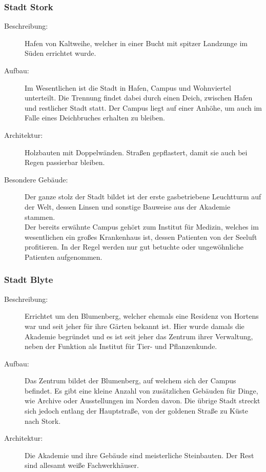 \documentclass[a4paper,12pt,oneside]{book}
\begin{document}
\subsubsection{Stadt Stork}
\begin{description}
\item[Beschreibung:]Hafen von Kaltweihe, welcher in einer Bucht mit spitzer Landzunge im Süden errichtet wurde.
\item[Aufbau:]Im Wesentlichen ist die Stadt in Hafen, Campus und Wohnviertel unterteilt. Die Trennung findet dabei durch einen Deich, zwischen Hafen und restlicher Stadt statt. Der Campus liegt auf einer Anhöhe, um auch im Falle eines Deichbruches erhalten zu bleiben.
\item[Architektur:]Holzbauten mit Doppelwänden. Straßen gepflastert, damit sie auch bei Regen passierbar bleiben.
\item[Besondere Gebäude:]Der ganze stolz der Stadt bildet ist der erste gasbetriebene Leuchtturm auf der Welt, dessen Linsen und sonstige Bauweise aus der Akademie stammen.
\\Der bereits erwähnte Campus gehört zum Institut für Medizin, welches im wesentlichen ein großes Krankenhaus ist, dessen Patienten von der Seeluft profitieren. In der Regel werden nur gut betuchte oder ungewöhnliche Patienten aufgenommen.
\end{description}

\subsubsection{Stadt Blyte}
\begin{description}
\item[Beschreibung:]Errichtet um den Blumenberg, welcher ehemals eine Residenz von Hortens war und seit jeher für ihre Gärten bekannt ist. Hier wurde damals die Akademie begründet und es ist seit jeher das Zentrum ihrer Verwaltung, neben der Funktion als Institut für Tier- und Pflanzenkunde.
\item[Aufbau:]Das Zentrum bildet der Blumenberg, auf welchem sich der Campus befindet. Es gibt eine kleine Anzahl von zusätzlichen Gebäuden für Dinge, wie Archive oder Ausstellungen im Norden davon. Die übrige Stadt streckt sich jedoch entlang der Hauptstraße, von der goldenen Straße zu Küste nach Stork.
\item[Architektur:]Die Akademie und ihre Gebäude sind meisterliche Steinbauten. Der Rest sind allesamt weiße Fachwerkhäuser.
\end{description}
\end{document}
